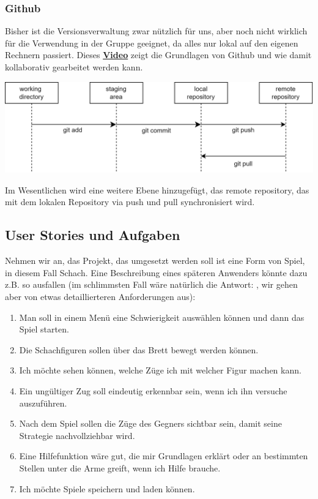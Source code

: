 \documentclass{article}
\begin{document}
\subsubsection{Github}
Bisher ist die Versionsverwaltung zwar nützlich für uns, aber noch nicht wirklich für die Verwendung in der Gruppe geeignet, da alles nur lokal auf den eigenen Rechnern passiert. Dieses \textbf{\href{https://youtu.be/YenryzR6xug}{Video}} zeigt die Grundlagen von Github und wie damit kollaborativ gearbeitet werden kann. 
\begin{center}
    \includegraphics[scale=0.2]{../media/push_pull.png}
\end{center}
Im Wesentlichen wird eine weitere Ebene hinzugefügt, das remote repository, das mit dem lokalen Repository via push und pull synchronisiert wird.
\subsection{User Stories und Aufgaben}
\label{sec:hwUserStories}

Nehmen wir an, das Projekt, das umgesetzt werden soll ist eine Form von Spiel, in diesem Fall Schach. Eine Beschreibung eines späteren Anwenders könnte dazu z.B. so ausfallen (im schlimmsten Fall wäre natürlich die Antwort: , wir gehen aber von etwas detaillierteren Anforderungen aus):
\begin{enumerate}
    \item Man soll in einem Menü eine Schwierigkeit auswählen können und dann das Spiel starten.
    \item Die Schachfiguren sollen über das Brett bewegt werden können.
    \item Ich möchte sehen können, welche Züge ich mit welcher Figur machen kann. 
    \item Ein ungültiger Zug soll eindeutig erkennbar sein, wenn ich ihn versuche auszuführen. 
    \item Nach dem Spiel sollen die Züge des Gegners sichtbar sein, damit seine Strategie nachvollziehbar wird. 
    \item Eine Hilfefunktion wäre gut, die mir Grundlagen erklärt oder an bestimmten Stellen unter die Arme greift, wenn ich Hilfe brauche. 
    \item Ich möchte Spiele speichern und laden können.
\end{enumerate}
\end{document}
